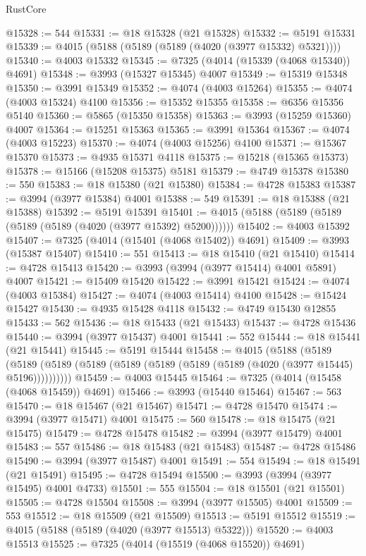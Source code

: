 \begin{lexlean}{RustCore}
\begin{coremodule}
@15328 := 544
@15331 := @18 @15328 (@21 @15328)
@15332 := @5191 @15331
@15339 := @4015 (@5188 (@5189 (@5189 (@4020 (@3977 @15332) @5321))))
@15340 := @4003 @15332
@15345 := @7325 (@4014 (@15339 (@4068 @15340)) @4691)
@15348 := @3993 (@15327 @15345) @4007
@15349 := @15319 @15348
@15350 := @3991 @15349
@15352 := @4074 (@4003 @15264)
@15355 := @4074 (@4003 @15324) @4100
@15356 := @15352 @15355
@15358 := @6356 @15356 @5140
@15360 := @5865 (@15350 @15358)
@15363 := @3993 (@15259 @15360) @4007
@15364 := @15251 @15363
@15365 := @3991 @15364
@15367 := @4074 (@4003 @15223)
@15370 := @4074 (@4003 @15256) @4100
@15371 := @15367 @15370
@15373 := @4935 @15371 @4118
@15375 := @15218 (@15365 @15373)
@15378 := @15166 (@15208 @15375) @5181
@15379 := @4749 @15378
@15380 := 550
@15383 := @18 @15380 (@21 @15380)
@15384 := @4728 @15383
@15387 := @3994 (@3977 @15384) @4001
@15388 := 549
@15391 := @18 @15388 (@21 @15388)
@15392 := @5191 @15391
@15401 := @4015 (@5188 (@5189 (@5189 (@5189 (@5189 (@4020 (@3977 @15392) @5200))))))
@15402 := @4003 @15392
@15407 := @7325 (@4014 (@15401 (@4068 @15402)) @4691)
@15409 := @3993 (@15387 @15407)
@15410 := 551
@15413 := @18 @15410 (@21 @15410)
@15414 := @4728 @15413
@15420 := @3993 (@3994 (@3977 @15414) @4001 @5891) @4007
@15421 := @15409 @15420
@15422 := @3991 @15421
@15424 := @4074 (@4003 @15384)
@15427 := @4074 (@4003 @15414) @4100
@15428 := @15424 @15427
@15430 := @4935 @15428 @4118
@15432 := @4749 @15430 @12855
@15433 := 562
@15436 := @18 @15433 (@21 @15433)
@15437 := @4728 @15436
@15440 := @3994 (@3977 @15437) @4001
@15441 := 552
@15444 := @18 @15441 (@21 @15441)
@15445 := @5191 @15444
@15458 := @4015
    (@5188
      (@5189 (@5189 (@5189 (@5189 (@5189 (@5189 (@5189 (@5189 (@4020 (@3977 @15445) @5196))))))))))
@15459 := @4003 @15445
@15464 := @7325 (@4014 (@15458 (@4068 @15459)) @4691)
@15466 := @3993 (@15440 @15464)
@15467 := 563
@15470 := @18 @15467 (@21 @15467)
@15471 := @4728 @15470
@15474 := @3994 (@3977 @15471) @4001
@15475 := 560
@15478 := @18 @15475 (@21 @15475)
@15479 := @4728 @15478
@15482 := @3994 (@3977 @15479) @4001
@15483 := 557
@15486 := @18 @15483 (@21 @15483)
@15487 := @4728 @15486
@15490 := @3994 (@3977 @15487) @4001
@15491 := 554
@15494 := @18 @15491 (@21 @15491)
@15495 := @4728 @15494
@15500 := @3993 (@3994 (@3977 @15495) @4001 @4733)
@15501 := 555
@15504 := @18 @15501 (@21 @15501)
@15505 := @4728 @15504
@15508 := @3994 (@3977 @15505) @4001
@15509 := 553
@15512 := @18 @15509 (@21 @15509)
@15513 := @5191 @15512
@15519 := @4015 (@5188 (@5189 (@4020 (@3977 @15513) @5322)))
@15520 := @4003 @15513
@15525 := @7325 (@4014 (@15519 (@4068 @15520)) @4691)

\end{coremodule}
\end{lexlean}

